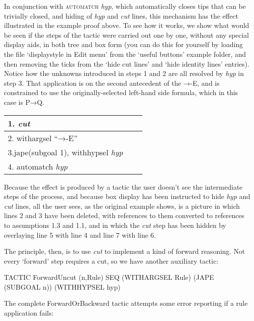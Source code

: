 \documentclass[11pt]{book}
\newcommand{\tab}{\hspace{5mm}}
\begin{document}
In conjunction with \textsc{automatch} \textit{hyp}, which automatically closes tips that can be trivially closed, and hiding of \textit{hyp} and \textit{cut} lines, this mechanism has the effect illustrated in the example proof above. To see how it works, we show what would be seen if the steps of the tactic were carried out one by one, without any special display aids, in both tree and box form (you can do this for yourself by loading the file `displaystyle in Edit menu' from the `useful buttons' example folder, and then removing the ticks from the `hide cut lines' and `hide identity lines' entries). Notice how the unknowns introduced in steps 1 and 2 are all resolved by \textit{hyp} in step 3. That application is on the second antecedent of the →-E, and is constrained to use the originally-selected left-hand side formula, which in this case is P→Q.\\


\begin{tabular}{|p{0.939in}|p{1.123in}|p{2.439in}|}
\hline
{\raggedright 1. \textit{cut}} & 
{\centering } & 
{\raggedright }\\
\hline
{\raggedright 2. withargsel ``{\small →-E''}} & 
{\centering } & 
{\raggedright }\\
\hline
{\raggedright 3.\tab jape(subgoal 1), withhypsel \textit{hyp} } & 
{\centering } & 
{\raggedright }\\
\hline
{\raggedright 4. automatch \textit{hyp}} & 
{\centering } & 
{\raggedright }\\
\hline
\end{tabular}


Because the effect is produced by a tactic the user doesn't see the intermediate steps of the process, and because box display has been instructed to hide \textit{hyp} and \textit{cut} lines, all the user sees, as the original example shows, is a picture in which lines 2 and 3 have been deleted, with references to them converted to references to assumptions 1.3 and 1.1, and in which the \textit{cut} step has been hidden by overlaying line 5 with line 4 and line 7 with line 6.


The principle, then, is to use \textit{cut} to implement a kind of forward reasoning. Not every `forward' step requires a cut, so we have another auxiliary tactic:

TACTIC ForwardUncut (n,Rule) SEQ (WITHARGSEL Rule) (JAPE (SUBGOAL n)) (WITHHYPSEL hyp)


The complete ForwardOrBackward tactic attempts some error reporting if a rule application fails:
\end{document}
